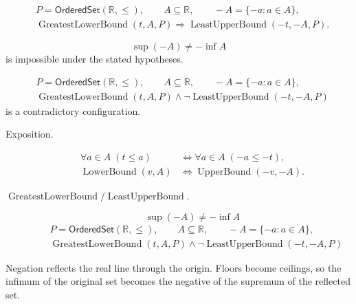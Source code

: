 \begin{remark*}
\[
\begin{aligned}
&P=\mathsf{OrderedSet}(\mathbb{R},\leq),\qquad A\subseteq\mathbb{R},\qquad -A=\{-a:a\in A\},\\
&\operatorname{GreatestLowerBound}(t,A,P)
\Longrightarrow
\operatorname{LeastUpperBound}(-t,-A,P).
\end{aligned}
\]
\end{remark*}

\begin{remark*}
\[
\sup(-A)\ne -\inf A
\]
is impossible under the stated hypotheses.
\end{remark*}

\begin{remark*}
\[
\begin{aligned}
&P=\mathsf{OrderedSet}(\mathbb{R},\leq),\qquad A\subseteq\mathbb{R},\qquad -A=\{-a:a\in A\},\\
&\operatorname{GreatestLowerBound}(t,A,P)\land
\neg\operatorname{LeastUpperBound}(-t,-A,P)
\end{aligned}
\]
is a contradictory configuration.
\end{remark*}

\begin{remark*}
\begin{description}
  \item[Exposition.]
\[
\begin{aligned}
\forall a\in A\;(t\leq a)
&\Longleftrightarrow
\forall a\in A\;(-a\leq -t),\\
\operatorname{LowerBound}(v,A)
&\Longleftrightarrow
\operatorname{UpperBound}(-v,-A).
\end{aligned}
\]


  \item[\(\operatorname{GreatestLowerBound} / \operatorname{LeastUpperBound}.\)]
  \[
\sup(-A)\ne -\inf A
\]
\[
\begin{aligned}
&P=\mathsf{OrderedSet}(\mathbb{R},\leq),\qquad A\subseteq\mathbb{R},\qquad -A=\{-a:a\in A\},\\
&\operatorname{GreatestLowerBound}(t,A,P)\land
\neg\operatorname{LeastUpperBound}(-t,-A,P)
\end{aligned}
\]
\end{description}
\end{remark*}

\begin{remark*}[Interpretation]
Negation reflects the real line through the origin. Floors become ceilings, so the infimum of the original set becomes the negative of the supremum of the reflected set.
\end{remark*}

